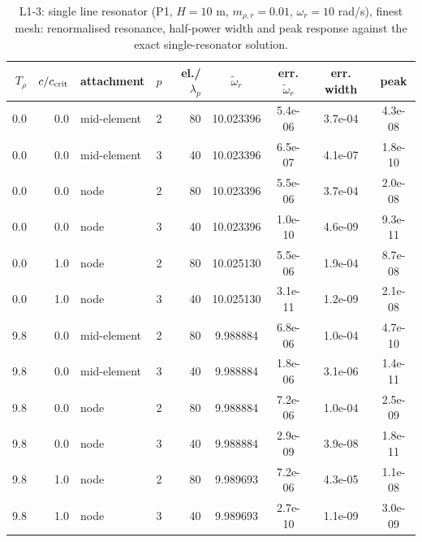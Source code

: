 \begin{table}[htbp]
\centering
\caption{L1-3: single line resonator (P1, $H = 10$ m, $m_{\rho,r} = 0.01$, $\omega_r = 10$ rad/s), finest mesh: renormalised resonance, half-power width and peak response against the exact single-resonator solution.}
\label{tab:L1-3}
\begin{tabular}{rrlrrcccc}
\toprule
$T_\rho$ & $c/c_{\rm crit}$ & attachment & $p$ & el./$\lambda_p$ & $\tilde\omega_r$ & err. $\tilde\omega_r$ & err. width & peak \\
\midrule
0.0 & 0.0 & mid-element & 2 & 80 & 10.023396 & 5.4e-06 & 3.7e-04 & 4.3e-08 \\
0.0 & 0.0 & mid-element & 3 & 40 & 10.023396 & 6.5e-07 & 4.1e-07 & 1.8e-10 \\
0.0 & 0.0 & node & 2 & 80 & 10.023396 & 5.5e-06 & 3.7e-04 & 2.0e-08 \\
0.0 & 0.0 & node & 3 & 40 & 10.023396 & 1.0e-10 & 4.6e-09 & 9.3e-11 \\
0.0 & 1.0 & node & 2 & 80 & 10.025130 & 5.5e-06 & 1.9e-04 & 8.7e-08 \\
0.0 & 1.0 & node & 3 & 40 & 10.025130 & 3.1e-11 & 1.2e-09 & 2.1e-08 \\
9.8 & 0.0 & mid-element & 2 & 80 & 9.988884 & 6.8e-06 & 1.0e-04 & 4.7e-10 \\
9.8 & 0.0 & mid-element & 3 & 40 & 9.988884 & 1.8e-06 & 3.1e-06 & 1.4e-11 \\
9.8 & 0.0 & node & 2 & 80 & 9.988884 & 7.2e-06 & 1.0e-04 & 2.5e-09 \\
9.8 & 0.0 & node & 3 & 40 & 9.988884 & 2.9e-09 & 3.9e-08 & 1.8e-11 \\
9.8 & 1.0 & node & 2 & 80 & 9.989693 & 7.2e-06 & 4.3e-05 & 1.1e-08 \\
9.8 & 1.0 & node & 3 & 40 & 9.989693 & 2.7e-10 & 1.1e-09 & 3.0e-09 \\
\bottomrule
\end{tabular}
\end{table}
